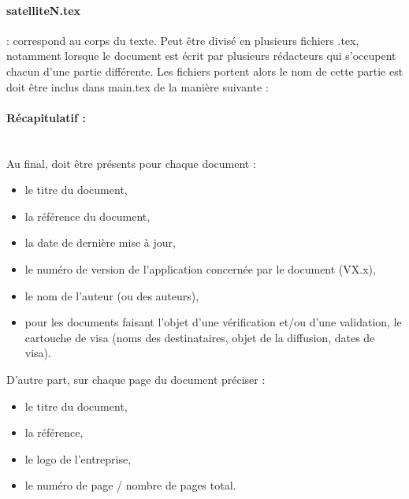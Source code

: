           \paragraph{satelliteN.tex} : correspond au corps du texte. Peut être divisé en plusieurs fichiers .tex, notamment lorsque le document
                est écrit par plusieurs rédacteurs qui s'occupent chacun d'une partie différente. Les fichiers portent alors le nom de cette partie
                est doit être inclus dans main.tex de la manière suivante :
\begin{center}\begin{boxedverbatim}

\end{boxedverbatim} 
\end{center}
           
       
      
      \paragraph{Récapitulatif :\\~\\}  
       Au final, doit être présents pour chaque document :
      \begin{itemize}
        \item le titre du document,
        \item la référence du document,
        \item la date de dernière mise à jour,
        \item le numéro de version de l'application concernée par le document (VX.x),
        \item le nom de l’auteur (ou des auteurs),
        \item pour les documents faisant l'objet d'une vérification et/ou d'une validation, le cartouche de visa (noms des destinataires, objet de la diffusion, dates de visa).\\
      \end{itemize}                                                                                                        
      D’autre part, sur chaque page du document préciser : \\
      \begin{itemize}
        \item le titre du document,
        \item la référence,
        \item le logo de l'entreprise,
        \item le numéro de page / nombre de pages total.
      \end{itemize}         
      
